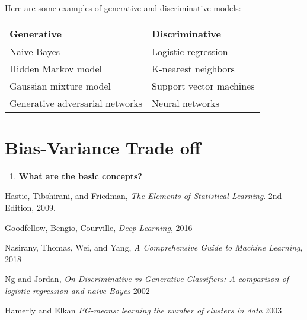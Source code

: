 \documentclass{article}
\begin{document}
\begin{enumerate}
    \noindent 
    \smallbreak
    Here are some examples of generative and discriminative models:
    \begin{center}
      \begin{tabular}{ l l }
        \hline
        \textbf{Generative} & \textbf{Discriminative} \\
        \hline
        Naive Bayes & Logistic regression \\
        Hidden Markov model & K-nearest neighbors \\ 
        Gaussian mixture model & Support vector machines \\
        Generative adversarial networks & Neural networks \\ 
        \hline
      \end{tabular}
    \end{center}
    
\end{enumerate}
\pagebreak

\section{Bias-Variance Trade off}
\noindent
\begin{enumerate}
    \item \textbf{What are the basic concepts?}
    \noindent 
    \smallbreak
    
\end{enumerate}


\begin{thebibliography}{}
Hastie, Tibshirani, and Friedman,
\emph{The Elements of Statistical Learning}.
2nd Edition,
2009.

Goodfellow, Bengio, Courville,
\emph{Deep Learning},
2016

Nasirany, Thomas, Wei, and Yang,
\emph{A Comprehensive Guide to Machine Learning},
2018

Ng and Jordan,
\emph{On Discriminative vs Generative Classifiers: A comparison of logistic regression and naive Bayes}
2002

Hamerly and Elkan
\emph{PG-means: learning the number of clusters in data}
2003

\end{thebibliography}
\end{document}
